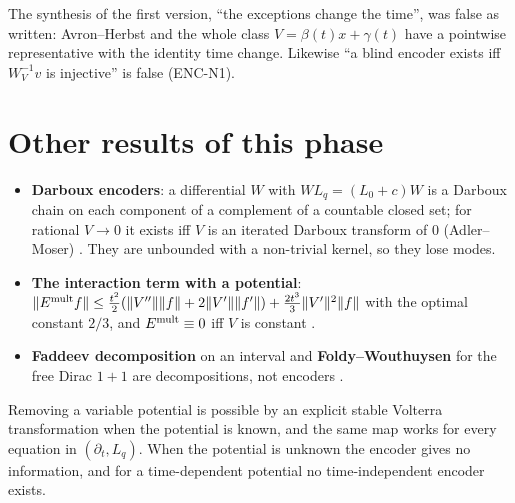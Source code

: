 \begin{caution}[title=An earlier claim that turned out false]
The synthesis of the first version, ``the exceptions change the time'', was false as written: Avron--Herbst and the whole class $V=\beta(t)x+\gamma(t)$ have a pointwise representative with the identity time change. Likewise ``a blind encoder exists iff $W_V^{-1}v$ is injective'' is false (ENC-N1).
\end{caution}

\section{Other results of this phase}

\begin{itemize}
\item \textbf{Darboux encoders}: a differential $W$ with $WL_q=(L_0+c)W$ is a Darboux chain on each component of a complement of a countable closed set; for rational $V\to0$ it exists iff $V$ is an iterated Darboux transform of $0$ (Adler--Moser) . They are unbounded with a non-trivial kernel, so they lose modes.
\item \textbf{The interaction term with a potential}: $\|E^{\rm mult}f\|\le\frac{t^2}2(\|V''\|\|f\|+2\|V'\|\|f'\|)+\frac{2t^3}3\|V'\|^2\|f\|$ with the optimal constant $2/3$, and $E^{\rm mult}\equiv0$ iff $V$ is constant .
\item \textbf{Faddeev decomposition} on an interval and \textbf{Foldy--Wouthuysen} for the free Dirac $1+1$ are decompositions, not encoders .
\end{itemize}

\begin{takeaway}
Removing a variable potential is possible by an explicit stable Volterra transformation when the potential is known, and the same map works for every equation in $(\partial_t,L_q)$. When the potential is unknown the encoder gives no information, and for a time-dependent potential no time-independent encoder exists.
\end{takeaway}
